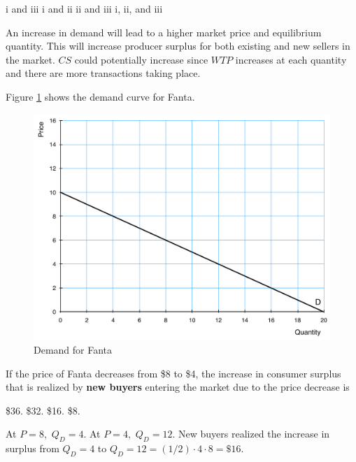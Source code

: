 \documentclass[addpoints,11pt]{exam}
\theoremstyle{definition}
\begin{document}
\begin{questions}
	\begin{choices}
		\choice i and iii
		\CorrectChoice i and ii
		\choice ii and iii
		\choice i, ii, and iii
	\end{choices}
	
	\begin{solution}
		An increase in demand will lead to a higher market price and equilibrium quantity. This will increase producer surplus for both existing and new sellers in the market. $CS$ could potentially increase since $WTP$ increases at each quantity and there are more transactions taking place.
	\end{solution}
	
\newpage
	
	\question Figure \ref{MC23} shows the demand curve for Fanta.
		
		\begin{figure}[H]
			\centering
			\includegraphics[scale=.45]{Exam1_MC22.pdf}
			\caption{Demand for Fanta}
			\label{MC23}
		\end{figure}
		
		If the price of Fanta decreases from \$8 to \$4, the increase in consumer surplus that is realized by \textbf{new buyers} entering the market due to the price decrease is 
		
		\begin{choices}
			\choice \$36.
			\choice \$32.
			\CorrectChoice \$16.
			\choice \$8.
		\end{choices}	
		
		\begin{solution}
			At $P=8,$ $Q_D = 4.$ At $P = 4,$ $Q_D = 12.$ New buyers realized the increase in surplus from $Q_D = 4$ to $Q_D = 12 = (1/2)\cdot4\cdot8=\$16.$
		\end{solution}



\end{questions}
\end{document}
